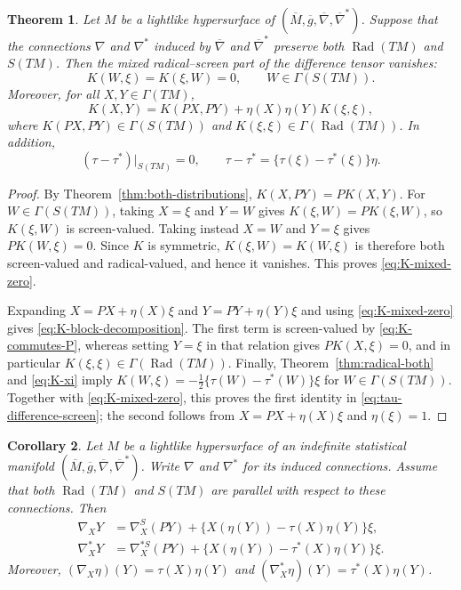 \documentclass[11pt,a4paper]{article}
\newtheorem{theorem}{Theorem}[section]
\newtheorem{corollary}[theorem]{Corollary}
\theoremstyle{remark}
\theoremstyle{definition}
\newcommand{\Rad}{\operatorname{Rad}}
\begin{document}
\begin{theorem}\label{thm:K-splitting}
Let $M$ be a lightlike hypersurface of
$(\overline{M},\overline{g},\overline{\nabla},\overline{\nabla}^{*})$.
Suppose that the connections $\nabla$ and $\nabla^{*}$ induced by
$\overline{\nabla}$ and $\overline{\nabla}^{*}$ preserve both
$\Rad(TM)$ and $S(TM)$. Then the mixed radical--screen part of the
difference tensor vanishes:
\begin{equation}\label{eq:K-mixed-zero}
K(W,\xi)=K(\xi,W)=0,
\qquad W\in\Gamma(S(TM)).
\end{equation}
Moreover, for all $X,Y\in\Gamma(TM)$,
\begin{equation}\label{eq:K-block-decomposition}
K(X,Y)=K(PX,PY)+\eta(X)\eta(Y)K(\xi,\xi),
\end{equation}
where $K(PX,PY)\in\Gamma(S(TM))$ and
$K(\xi,\xi)\in\Gamma(\Rad(TM))$. In addition,
\begin{equation}\label{eq:tau-difference-screen}
(\tau-\tau^{*})|_{S(TM)}=0,
\qquad
\tau-\tau^{*}=\{\tau(\xi)-\tau^{*}(\xi)\}\eta.
\end{equation}
\end{theorem}

\begin{proof}
By Theorem~\ref{thm:both-distributions},
$K(X,PY)=PK(X,Y)$. For $W\in\Gamma(S(TM))$, taking $X=\xi$ and
$Y=W$ gives $K(\xi,W)=PK(\xi,W)$, so $K(\xi,W)$ is screen-valued.
Taking instead $X=W$ and $Y=\xi$ gives $PK(W,\xi)=0$. Since $K$ is
symmetric, $K(\xi,W)=K(W,\xi)$ is therefore both screen-valued and
radical-valued, and hence it vanishes. This proves
\eqref{eq:K-mixed-zero}.

Expanding $X=PX+\eta(X)\xi$ and $Y=PY+\eta(Y)\xi$ and using
\eqref{eq:K-mixed-zero} gives \eqref{eq:K-block-decomposition}. The first
term is screen-valued by \eqref{eq:K-commutes-P}, whereas setting
$Y=\xi$ in that relation gives $PK(X,\xi)=0$, and in particular
$K(\xi,\xi)\in\Gamma(\Rad(TM))$. Finally, Theorem~\ref{thm:radical-both}
and \eqref{eq:K-xi} imply
$K(W,\xi)=-\frac12\{\tau(W)-\tau^{*}(W)\}\xi$ for
$W\in\Gamma(S(TM))$. Together with \eqref{eq:K-mixed-zero}, this proves
the first identity in \eqref{eq:tau-difference-screen}; the second follows
from $X=PX+\eta(X)\xi$ and $\eta(\xi)=1$.
\end{proof}

\begin{corollary}\label{cor:connection-decomposition}
Let $M$ be a lightlike hypersurface of an indefinite statistical manifold
$(\overline{M},\overline{g},\overline{\nabla},\overline{\nabla}^{*})$.
Write $\nabla$ and $\nabla^{*}$ for its induced connections. Assume that
both $\Rad(TM)$ and $S(TM)$ are parallel with respect to these connections.
Then
\begin{align}
\nabla_XY
&=\nabla_X^{S}(PY)
 +\{X(\eta(Y))-\tau(X)\eta(Y)\}\xi,
\label{eq:nabla-under-parallel}\\
\nabla_X^{*}Y
&=\nabla_X^{*S}(PY)
 +\{X(\eta(Y))-\tau^{*}(X)\eta(Y)\}\xi.
\label{eq:nabla-star-under-parallel}
\end{align}
Moreover,
$(\nabla_X\eta)(Y)=\tau(X)\eta(Y)$ and
$(\nabla_X^{*}\eta)(Y)=\tau^{*}(X)\eta(Y)$.
\end{corollary}
\end{document}
